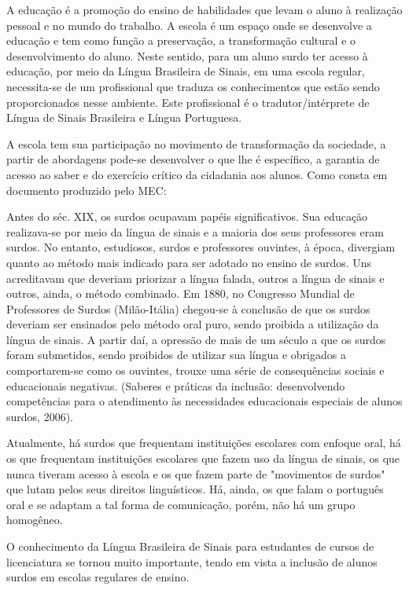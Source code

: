 \documentclass[brasil]{abnt}
\begin{document}
	A educação é a promoção do ensino de habilidades que levam o aluno à realização pessoal e no mundo do trabalho. 
	A escola é um espaço onde se desenvolve a educação e tem como função a preservação, a transformação cultural e o desenvolvimento do aluno. 
	Neste sentido, para um aluno surdo ter acesso à educação, por meio da Língua Brasileira de Sinais, em uma escola regular, necessita-se de um profissional 
	que traduza os conhecimentos que estão sendo proporcionados nesse ambiente. Este profissional é o tradutor/intérprete de Língua de Sinais 
	Brasileira e Língua Portuguesa.
	
	A escola tem sua participação no movimento de transformação da sociedade, a partir de abordagens pode-se desenvolver o que lhe é específico, a garantia de acesso 
	ao saber e do exercício crítico da cidadania aos alunos. Como consta em documento produzido pelo MEC:
		\begin{citacao} Antes do séc. XIX, os surdos ocupavam papéis significativos. Sua educação realizava-se por meio da língua de sinais e a maioria dos seus professores eram surdos. 
						No entanto, estudiosos, surdos e professores ouvintes, à época, divergiam quanto ao método mais indicado para ser adotado no ensino de surdos. Uns acreditavam que
						deveriam priorizar a língua falada, outros a língua de sinais e outros, ainda, o método combinado. Em 1880, no Congresso Mundial de Professores de Surdos (Milão-Itália) 
						chegou-se à conclusão de que os surdos deveriam ser ensinados pelo método oral puro, sendo proibida a utilização da língua de sinais. A partir daí, a opressão de mais de 
						um século a que os surdos foram submetidos, sendo proibidos de utilizar sua língua e obrigados a comportarem-se como os ouvintes, trouxe uma série de consequências sociais 
						e educacionais negativas. (Saberes e práticas da inclusão: desenvolvendo competências para o atendimento às necessidades educacionais especiais de alunos surdos, 2006).
		\end{citacao}

	Atualmente, há surdos que frequentam instituições escolares com enfoque oral, há os que frequentam instituições escolares que fazem uso da língua de sinais, os que nunca tiveram acesso à escola e os 
	que fazem parte de "movimentos de surdos" que lutam pelos seus direitos linguísticos. Há, ainda, os que falam o português oral e se adaptam a tal forma de comunicação, porém, não há um grupo homogêneo. 	
	
	O conhecimento da Língua Brasileira de Sinais para estudantes de cursos de licenciatura se tornou muito importante, tendo em vista a 
	inclusão de alunos surdos em escolas regulares de ensino.
	
\end{document}
